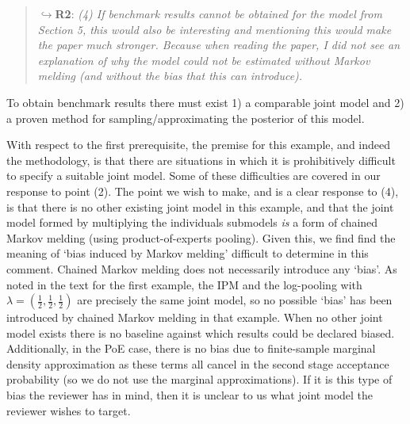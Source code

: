 \documentclass[
  10pt,
  a4paper,
]{article}
\begin{document}
\begin{quote}
\(\hookrightarrow\)\textbf{R2}: \emph{(4) If benchmark results cannot be
obtained for the model from Section 5, this would also be interesting
and mentioning this would make the paper much stronger. Because when
reading the paper, I did not see an explanation of why the model could
not be estimated without Markov melding (and without the bias that this
can introduce).}
\end{quote}

To obtain benchmark results there must exist 1) a comparable joint model
and 2) a proven method for sampling/approximating the posterior of this
model.

With respect to the first prerequisite, the premise for this example,
and indeed the methodology, is that there are situations in which it is
prohibitively difficult to specify a suitable joint model. Some of these
difficulties are covered in our response to point (2). The point we wish
to make, and is a clear response to (4), is that there is no other
existing joint model in this example, and that the joint model formed by
multiplying the individuals submodels \emph{is} a form of chained Markov
melding (using product-of-experts pooling). Given this, we find find the
meaning of `bias induced by Markov melding' difficult to determine in
this comment. Chained Markov melding does not necessarily introduce any
`bias'. As noted in the text for the first example, the IPM and the
log-pooling with \(\lambda = (\frac{1}{2}, \frac{1}{2}, \frac{1}{2})\)
are precisely the same joint model, so no possible `bias' has been
introduced by chained Markov melding in that example. When no other
joint model exists there is no baseline against which results could be
declared biased. Additionally, in the PoE case, there is no bias due to
finite-sample marginal density approximation as these terms all cancel
in the second stage acceptance probability (so we do not use the
marginal approximations). If it is this type of bias the reviewer has in
mind, then it is unclear to us what joint model the reviewer wishes to
target.
\end{document}
